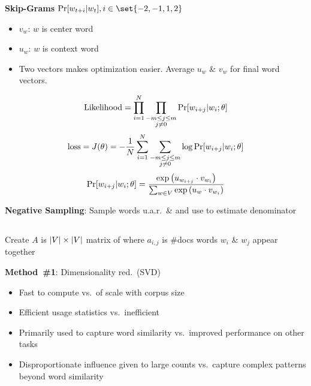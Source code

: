 \documentclass[8pt]{extarticle}
\renewcommand{\green}[1]{{\color{ForestGreen} #1}}
\newcommand{\greenbf}[1]{\textbf{\green{#1}}}
\begin{document}
\begin{multicols}{3}
  \greenbf{Skip-Grams} ${\Pr\sbrack{w_{t+i} \vert w_{t}}, i \in \set{-2,-1,1,2}}$
  \begin{itemize}
    \item $v_w$: $w$ is center word
    \item $u_w$: $w$ is context word
    \item Two vectors makes optimization easier. Average $u_w$ \& $v_w$ for final word vectors.
  \end{itemize}
  \begin{equation*}
    \text{Likelihood} = \prod_{i=1}^{N} \prod_{\substack{-m \leq j \leq m \\ j \ne 0}} \Pr\lbrack w_{i+j} \vert w_{i} ; \theta\rbrack
  \end{equation*}
  \begin{equation*}
    \text{loss} = J(\theta) = -\frac{1}{N}\sum_{i=1}^{N} \sum_{\substack{-m \leq j \leq m \\ j \ne 0}} \log \Pr\lbrack w_{i+j} \vert w_{i} ; \theta\rbrack
  \end{equation*}
  \begin{equation*}
    \Pr\lbrack w_{i+j} \vert w_{i} ; \theta\rbrack = \frac{\exp\left(u_{w_{i+j}} \cdot v_{w_i} \right)}{\sum_{w \in V} \exp\left(u_{w} \cdot v_{w_i} \right)}
  \end{equation*}

  \greenbf{Negative Sampling}: Sample words u.a.r.\ \& and use to estimate denominator

  \subsection*{}

  Create $A$ is ${\lvert V\rvert \times \lvert V\rvert}$ matrix of where $a_{i,j}$ is \#docs words $w_i$ \& $w_j$ appear together

  \greenbf{Method~\#1}: Dimensionality red.\ (SVD)

  \begin{itemize}
    \item Fast to compute vs.\ of scale with corpus size
    \item Efficient usage statistics vs.\ inefficient
    \item Primarily used to capture word similarity vs.\ improved performance on other tasks
    \item Disproportionate influence given to large counts vs.\ capture complex patterns beyond word similarity
  \end{itemize}


\end{multicols}
\end{document}
